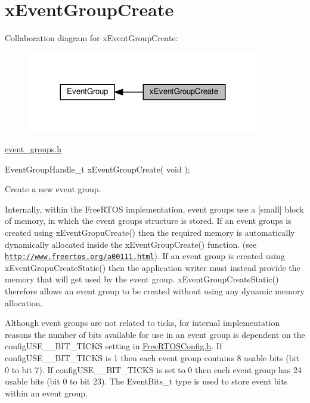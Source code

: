 \hypertarget{group__x_event_group_create}{}\section{x\+Event\+Group\+Create}
\label{group__x_event_group_create}
Collaboration diagram for x\+Event\+Group\+Create\+:\nopagebreak
\begin{figure}[H]
\begin{center}
\leavevmode
\includegraphics[width=287pt]{group__x_event_group_create}
\end{center}
\end{figure}
\hyperlink{event__groups_8h}{event\+\_\+groups.\+h} 
\begin{DoxyPre}
EventGroupHandle\_t xEventGroupCreate( void );
\end{DoxyPre}


Create a new event group.

Internally, within the Free\+R\+T\+OS implementation, event groups use a \mbox{[}small\mbox{]} block of memory, in which the event group\textquotesingle{}s structure is stored. If an event groups is created using x\+Event\+Gropu\+Create() then the required memory is automatically dynamically allocated inside the x\+Event\+Group\+Create() function. (see \href{http://www.freertos.org/a00111.html}{\tt http\+://www.\+freertos.\+org/a00111.\+html}). If an event group is created using x\+Event\+Gropu\+Create\+Static() then the application writer must instead provide the memory that will get used by the event group. x\+Event\+Group\+Create\+Static() therefore allows an event group to be created without using any dynamic memory allocation.

Although event groups are not related to ticks, for internal implementation reasons the number of bits available for use in an event group is dependent on the config\+U\+S\+E\+\_\+\_\+\+B\+I\+T\+\_\+\+T\+I\+C\+KS setting in \hyperlink{_free_r_t_o_s_config_8h}{Free\+R\+T\+O\+S\+Config.\+h}. If config\+U\+S\+E\+\_\+\_\+\+B\+I\+T\+\_\+\+T\+I\+C\+KS is 1 then each event group contains 8 usable bits (bit 0 to bit 7). If config\+U\+S\+E\+\_\+\_\+\+B\+I\+T\+\_\+\+T\+I\+C\+KS is set to 0 then each event group has 24 usable bits (bit 0 to bit 23). The Event\+Bits\+\_\+t type is used to store event bits within an event group.

